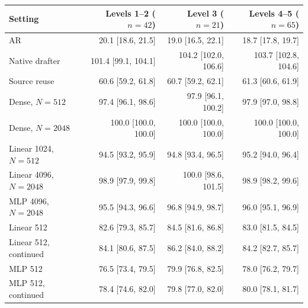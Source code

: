\begin{tabular}{lrrr}
\toprule
Setting & Levels 1--2 ($n=42$) & Level 3 ($n=21$) & Levels 4--5 ($n=65$) \\
\midrule
AR & 20.1 [18.6, 21.5] & 19.0 [16.5, 22.1] & 18.7 [17.8, 19.7] \\
Native drafter & 101.4 [99.1, 104.1] & 104.2 [102.0, 106.6] & 103.7 [102.8, 104.6] \\
Source reuse & 60.6 [59.2, 61.8] & 60.7 [59.2, 62.1] & 61.3 [60.6, 61.9] \\
Dense, $N=512$ & 97.4 [96.1, 98.6] & 97.9 [96.1, 100.2] & 97.9 [97.0, 98.8] \\
Dense, $N=2048$ & 100.0 [100.0, 100.0] & 100.0 [100.0, 100.0] & 100.0 [100.0, 100.0] \\
Linear 1024, $N=512$ & 94.5 [93.2, 95.9] & 94.8 [93.4, 96.5] & 95.2 [94.0, 96.4] \\
Linear 4096, $N=2048$ & 98.9 [97.9, 99.8] & 100.0 [98.6, 101.5] & 98.9 [98.2, 99.6] \\
MLP 4096, $N=2048$ & 95.5 [94.3, 96.6] & 96.8 [94.9, 98.7] & 96.0 [95.1, 96.9] \\
Linear 512 & 82.6 [79.3, 85.7] & 84.5 [81.6, 86.8] & 83.0 [81.5, 84.5] \\
Linear 512, continued & 84.1 [80.6, 87.5] & 86.2 [84.0, 88.2] & 84.2 [82.7, 85.7] \\
MLP 512 & 76.5 [73.4, 79.5] & 79.9 [76.8, 82.5] & 78.0 [76.2, 79.7] \\
MLP 512, continued & 78.4 [74.6, 82.0] & 79.8 [77.0, 82.0] & 80.0 [78.1, 81.7] \\
\bottomrule
\end{tabular}
